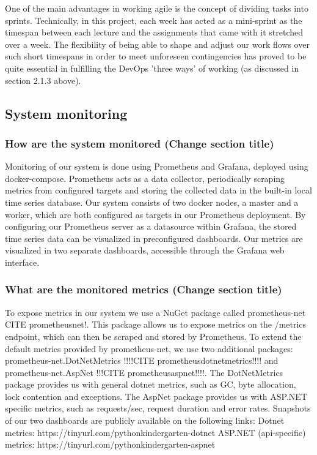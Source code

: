 One of the main advantages in working agile is the concept of dividing tasks into sprints. 
Technically, in this project, each week has acted as a mini-sprint as the timespan between each lecture and the assignments that came with it stretched over a week. The flexibility of being able to shape and adjust our work flows over such short timespans in order to meet unforeseen contingencies has proved to be quite essential in fulfilling the DevOps 'three ways' of working (as discussed in section 2.1.3 above).  
  
\subsection{System monitoring}
\subsubsection{How are the system monitored (Change section title)}
Monitoring of our system is done using Prometheus and Grafana, deployed using docker-compose. \newline
Prometheus acts as a data collector, periodically scraping metrics from configured targets and storing the collected data in the built-in local time series database.\newline
Our system consists of two docker nodes, a master and a worker, which are both configured as targets in our Prometheus deployment.\newline
By configuring our Prometheus server as a datasource within Grafana, the stored time series data can be visualized in preconfigured dashboards. Our metrics are visualized in two separate dashboards, accessible through the Grafana web interface.

\subsubsection{What are the monitored metrics (Change section title)}
To expose metrics in our system we use a NuGet package called prometheus-net CITE prometheusnet!.
This package allows us to expose metrics on the /metrics endpoint, which can then be scraped and stored by Prometheus.
\newline
To extend the default metrics provided by prometheus-net, we use two additional packages: 
prometheus-net.DotNetMetrics !!!!CITE prometheusdotnetmetrics!!!! and prometheus-net.AspNet !!!CITE prometheusaspnet!!!!.
\newline
The DotNetMetrics package provides us with general dotnet metrics, such as GC, byte allocation, lock contention and exceptions.
\newline
The AspNet package provides us with ASP.NET specific metrics, such as requests/sec, request duration and error rates.
\newline
\newline
Snapshots of our two dashboards are publicly available on the following links:
\newline
Dotnet metrics: https://tinyurl.com/pythonkindergarten-dotnet
\newline
ASP.NET (api-specific) metrics: https://tinyurl.com/pythonkindergarten-aspnet

